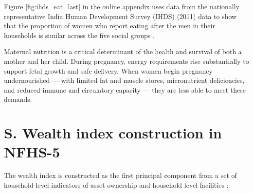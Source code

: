 Figure \ref{fig:ihds_eat_last} in the online appendix uses data from the nationally representative India Human Development Survey (IHDS) (2011) data to show that the proportion of women who report eating after the men in their households is similar across the five social groups \cite{DesaiVannemanIHDS2011}.



Maternal nutrition is a critical determinant of the health and survival of both a mother and her child. During pregnancy, energy requirements rise substantially to support fetal growth and safe delivery. When women begin pregnancy undernourished — with limited fat and muscle stores, micronutrient deficiencies, and reduced immune and circulatory capacity — they are less able to meet these demands. 



\section{S. Wealth index construction in NFHS-5}
\label{wealth_index}

The wealth index is constructed as the first principal component from a set of household-level indicators of asset ownership and household level facilities \citep{DHSIndiaWealth2019}:

